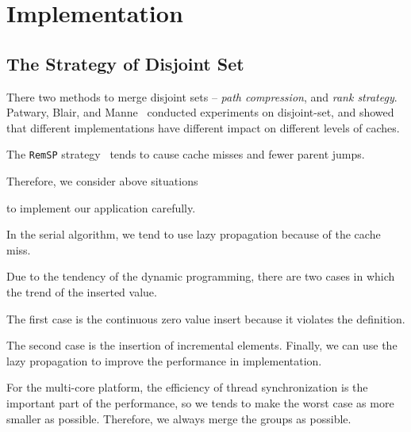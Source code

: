 \section{Implementation}
\label{sec:Implementation}

\subsection{The Strategy of Disjoint Set}

There two methods to merge disjoint sets -- {\em path compression},
and {\em rank strategy}.  Patwary, Blair, and
Manne~\cite{Patwary2010ExperimentsOU} conducted experiments on
disjoint-set, and showed that different implementations have different
impact on different levels of caches.


The {\tt RemSP} strategy~\cite{} tends to cause cache misses and fewer
parent jumps.  %

Therefore, we consider above situations %

to implement
our application carefully.

\iffalse
運行 VGLCS 時，將耗費 $\theta(n^2)$ 的內存空間。使用遞增後綴最大值 (ISMQ) 時，
採用並查集實作將會遭遇到很多不平衡的工作負載，其原因在於合併的策略，
常見的有路徑壓縮和啟發式合併兩種策略，這間接影響到不同次數的分枝判斷。
實務上須考慮到快取未中
\fi

In the serial algorithm, we tend to use lazy propagation because of
the cache miss.  %

Due to the tendency of the dynamic programming, there are two cases in
which the trend of the inserted value.  %


The first case is the continuous zero value insert because it violates
the definition.  %


The second case is the insertion of incremental elements.  Finally, we
can use the lazy propagation to improve the performance in
implementation.

For the multi-core platform, the efficiency of thread synchronization is
the important part of the performance, so we tends to make the worst
case as more smaller as possible.  Therefore, we always merge the groups
as possible.


\iffalse
每個執行緒負責數個完整的并查集，操作時應偏向延遲標記操作，
儘早合併的策略易造成快取未中。由於動態規劃的傾向中，插入值的趨勢有兩種情況，
其一為連續不合定義的零元素插入，其二為遞增元素的插入，在這兩者穿插的趨勢中，
我們發現延遲操作將會帶來較能改善快取未中問題。
\fi

